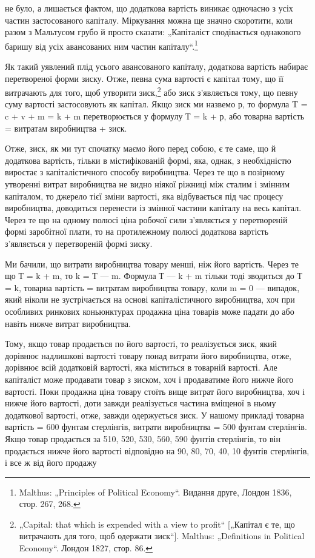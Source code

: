 \parcont{}  %
не було, а лишається фактом, що додаткова вартість виникає одночасно
з усіх частин застосованого капіталу. Міркування можна
ще значно скоротити, коли разом з Мальтусом грубо й просто
сказати: „Капіталіст сподівається однакового баришу від усіх
авансованих ним частин капіталу“.\footnote{
Malthus: „Principles of Political Economy“. Видання друге, Лондон 1836,
стор. 267, 268.
}

Як такий уявлений плід усього авансованого капіталу, додаткова
вартість набирає перетвореної форми зиску. Отже, певна
сума вартості є капітал тому, що її витрачають для того, щоб
утворити зиск,\footnote{
„Capital: that which is expended with a view to profit“ [„Капітал є те, що
витрачають для того, щоб одержати зиск“]. Malthus: „Definitions in Political
Economy“. Лондон 1827, стор. 86.
} або зиск з’являється тому, що певну суму вартості
застосовують як капітал. Якщо зиск ми назвемо р, то формула
T = c + v + m = k + m перетворюється у формулу Т = k + р, або
товарна вартість = витратам виробництва + зиск.

Отже, зиск, як ми тут спочатку маємо його перед собою,
є те саме, що й додаткова вартість, тільки в містифікованій
формі, яка, однак, з необхідністю виростає з капіталістичного
способу виробництва. Через те що в позірному утворенні витрат
виробництва не видно ніякої ріжниці між сталим і змінним
капіталом, то джерело тієї зміни вартості, яка відбувається
під час процесу виробництва, доводиться перенести із змінної
частини капіталу на весь капітал. Через те що на одному полюсі
ціна робочої сили з’являється у перетвореній формі заробітної
плати, то на протилежному полюсі додаткова вартість з’являється
у перетвореній формі зиску.

Ми бачили, що витрати виробництва товару менші, ніж його
вартість. Через те що Т = k + m, то k = Т — m. Формула
Т — k + m тільки тоді зводиться до Т = k, товарна вартість =
витратам виробництва товару, коли m = 0 — випадок, який
ніколи не зустрічається на основі капіталістичного виробництва,
хоч при особливих ринкових коньюнктурах продажна ціна товарів
може падати до або навіть нижче витрат виробництва.

Тому, якщо товар продається по його вартості, то реалізується
зиск, який дорівнює надлишкові вартості товару понад витрати
його виробництва, отже, дорівнює всій додатковій вартості, яка
міститься в товарній вартості. Але капіталіст може продавати
товар з зиском, хоч і продаватиме його нижче його вартості.
Поки продажна ціна товару стоїть вище витрат його виробництва,
хоч і нижче його вартості, доти завжди реалізується
частина вміщеної в ньому додаткової вартості, отже, завжди
одержується зиск. У нашому прикладі товарна вартість = 600
фунтам стерлінгів, витрати виробництва = 500 фунтам стерлінгів.
Якщо товар продається за 510, 520, 530, 560, 590 фунтів
стерлінгів, то він продається нижче його вартості відповідно на
90, 80, 70, 40, 10 фунтів стерлінгів, і все ж від його продажу
\parbreak{}  %

